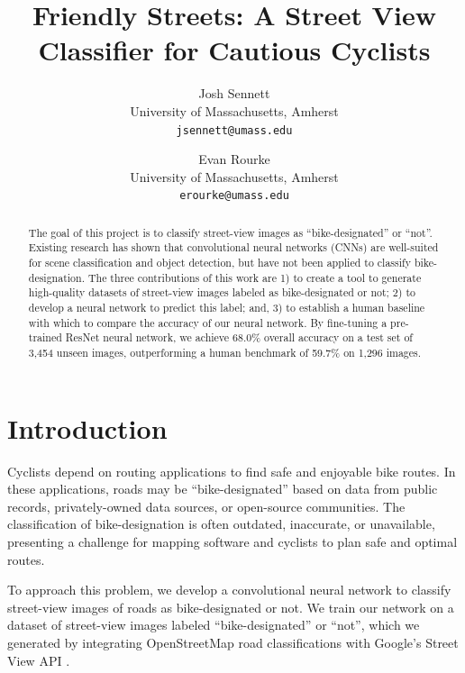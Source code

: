 \documentclass[10pt,twocolumn,letterpaper]{article}
\begin{document}
\title{Friendly Streets: A Street View Classifier for Cautious Cyclists}

\author{Josh Sennett\\
University of Massachusetts, Amherst\\
{\tt\small jsennett@umass.edu}
\and
Evan Rourke\\
University of Massachusetts, Amherst\\
{\tt\small erourke@umass.edu}
}

\maketitle

\begin{abstract}
The goal of this project is to classify street-view images as ``bike-designated'' or ``not''. Existing research has shown that convolutional neural networks (CNNs) are well-suited for scene classification and object detection, but have not been applied to classify bike-designation. The three contributions of this work are 1) to create a tool to generate high-quality datasets of street-view images labeled as bike-designated or not; 2) to develop a neural network to predict this label; and, 3) to establish a human baseline with which to compare the accuracy of our neural network. By fine-tuning a pre-trained ResNet neural network, we achieve 68.0\% overall accuracy on a test set of 3,454 unseen images, outperforming a human benchmark of 59.7\% on 1,296 images.
\end{abstract}

\section{Introduction}
\label{sec:intro}

Cyclists depend on routing applications to find safe and enjoyable bike routes. In these applications, roads may be ``bike-designated'' based on data from public records, privately-owned data sources, or open-source communities. The classification of bike-designation is often outdated, inaccurate, or unavailable, presenting a challenge for mapping software and cyclists to plan safe and optimal routes.

To approach this problem, we develop a convolutional neural network to classify street-view images of roads as bike-designated or not. We train our network on a dataset of street-view images labeled ``bike-designated'' or ``not'', which we generated by integrating OpenStreetMap \cite{osm} road classifications with Google's Street View API \cite{googlesv}.
\end{document}
